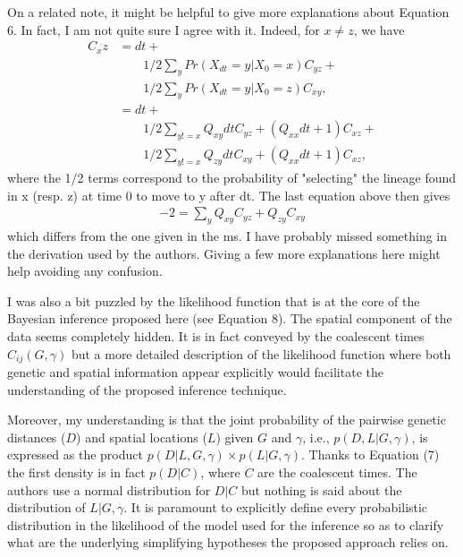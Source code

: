 \begin{point}{}
    On a related note, it might be helpful to give more explanations about Equation 6. In
    fact, I am not quite sure I agree with it. Indeed, for $x \neq z$, we have
    \begin{align*}
        C_xz &= dt + {} \\
                & \qquad
             1/2 \sum_y Pr(X_{dt} = y | X_0 = x) C_{yz} + {} \\
                & \qquad
             1/2 \sum_y Pr(X_{dt} = y | X_0 = z) C_{xy}, \\
           &= dt + {} \\
                & \qquad
             1/2 \sum_{y != x} Q_{xy} dt C_{yz} + (Q_{xx} dt + 1) C_{xz} + \\
                & \qquad
             1/2 \sum_{y != x} Q_{zy} dt C_{xy} + (Q_{xx} dt + 1) C_{xz},
    \end{align*}
    where the 1/2 terms correspond to the probability of "selecting" the lineage found in x
    (resp. z) at time 0 to move to y after dt. The last equation above then gives
    \begin{align*}
        -2 = \sum_y Q_{xy} C_{yz} + Q_{zy} C_{xy}
    \end{align*}
    which differs from the one given in the ms. I have probably missed something in the derivation
    used by the authors. Giving a few more explanations here might help avoiding any confusion.
\end{point}

\reply{
}



\begin{point}{}
    I was also a bit puzzled by the likelihood function that is at the core of the
    Bayesian inference proposed here (see Equation 8). The spatial component of
    the data seems completely hidden. It is in fact conveyed by the coalescent
    times $C_{ij}(G,\gamma)$ but a more detailed description of the likelihood
    function where both genetic and spatial information appear explicitly would
    facilitate the understanding of the proposed inference technique.
\end{point}

\begin{point}{}
    Moreover, my understanding is that the joint probability of the pairwise genetic distances
    ($D$) and spatial locations ($L$) given $G$ and $\gamma$, i.e.,
    $p(D,L|G,\gamma)$, is expressed as the product 
    $p(D|L,G,\gamma) \times p(L|G,\gamma)$.  Thanks to Equation (7) the first density is in fact
    $p(D|C)$, where $C$ are the coalescent times. The authors use a normal distribution for $D|C$ but
    nothing is said  about the distribution of $L|G,\gamma$. It is paramount to explicitly define
    every probabilistic distribution in the likelihood of the model used for the inference so as
    to clarify what are the underlying simplifying hypotheses the proposed approach relies on.
\end{point}

